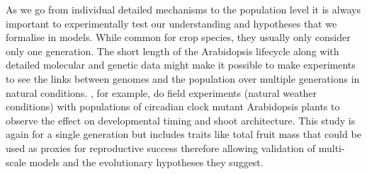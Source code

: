 As we go from individual detailed mechanisms to the population level it is
always important to experimentally test our understanding and hypotheses that we
formalise in models. While common for crop species, they usually only consider only one
generation. The short length of the Arabidopsis lifecycle along with detailed
molecular and genetic data might make it possible to make experiments to see the
links between genomes and the population over multiple generations in natural
conditions.  \citet{rubin_circadian_2018}, for example, do field experiments
(natural weather conditions) with populations of circadian clock mutant
Arabidopsis plants to observe the effect on developmental timing and shoot
architecture. This study is again for a single generation but includes traits
like total fruit mass that could be used as proxies for reproductive success
therefore allowing validation of multi-scale models and the evolutionary
hypotheses they suggest.











